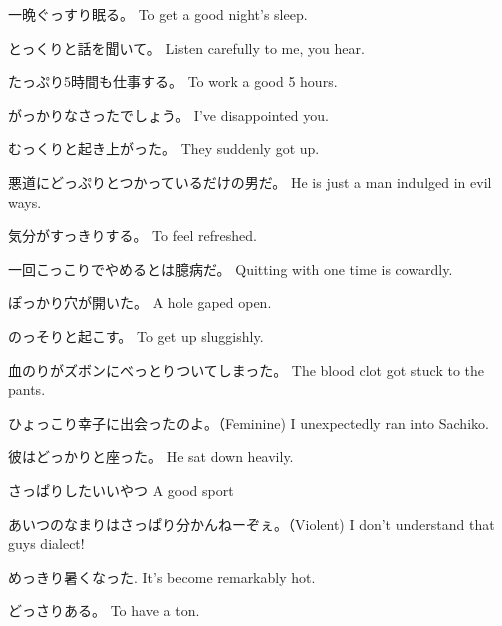 \par{一晩ぐっすり眠る。 \hfill\break
To get a good night's sleep. }

\par{とっくりと話を聞いて。 \hfill\break
Listen carefully to me, you hear. }

\par{たっぷり5時間も仕事する。 \hfill\break
To work a good 5 hours. }

\par{がっかりなさったでしょう。 \hfill\break
I've disappointed you. }

\par{むっくりと起き上がった。 \hfill\break
They suddenly got up. }

\par{悪道にどっぷりとつかっているだけの男だ。 \hfill\break
He is just a man indulged in evil ways. }

\par{気分がすっきりする。 \hfill\break
To feel refreshed. }

\par{一回こっこりでやめるとは臆病だ。 \hfill\break
Quitting with one time is cowardly. \hfill\break
}

\par{ぽっかり穴が開いた。 \hfill\break
A hole gaped open. }
 
\par{のっそりと起こす。 \hfill\break
To get up sluggishly. }

\par{血のりがズボンにべっとりついてしまった。 \hfill\break
The blood clot got stuck to the pants. }

\par{ひょっこり幸子に出会ったのよ。（Feminine) \hfill\break
I unexpectedly ran into Sachiko. }

\par{彼はどっかりと座った。 \hfill\break
He sat down heavily. }

\par{さっぱりしたいいやつ \hfill\break
A good sport }

\par{あいつのなまりはさっぱり分かんねーぞぇ。（Violent) \hfill\break
I don't understand that guys dialect! }

\par{めっきり暑くなった. \hfill\break
It's become remarkably hot. }

\par{どっさりある。 \hfill\break
To have a ton. }


